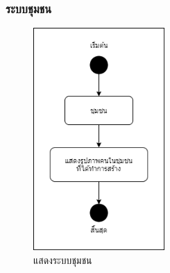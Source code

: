 \documentclass[12pt,oneside,openright,a4paper]{cpe-thai-project}
\begin{document}
\subsubsection{ระบบชุมชน}
\begin{figure}[!h]
  \centering
  \includegraphics[width=5cm]{./image/ad-commu.png}
  \caption{แสดงระบบชุมชน}
  \label{fig:ad-commu}
\end{figure}
\end{document}

